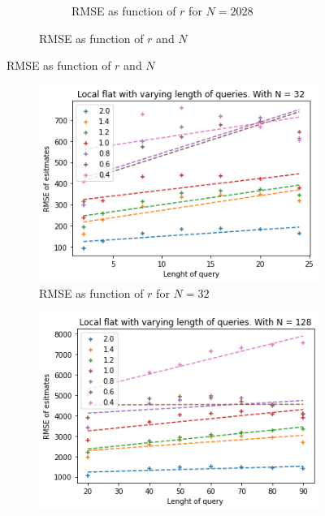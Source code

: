 \documentclass[11pt]{article}
\theoremstyle{definition}
\begin{document}
\begin{figure}[H]
\begin{subfigure}{.4\textwidth}
\begin{subfigure}{\textwidth}
  \caption{RMSE as function of $r$ for $N=2028$}
  \label{fig:19}
\end{subfigure}
\caption{RMSE as function of $r$ and $N$}
\label{fig:20}
\end{subfigure}
\caption{RMSE as function of $r$ and $N$}
\label{fig:21}
\end{figure}
\begin{figure}[H]
\centering
\begin{subfigure}{.4\textwidth}
  \centering
  \includegraphics[width=\linewidth]{figures/local_flat/varying_r/loc_flat_varying_length_N_linear_=32.png}
  \caption{RMSE as function of $r$ for $N=32$}
  \label{fig:22}
\end{subfigure}%
\begin{subfigure}{.4\textwidth}
  \centering
  \includegraphics[width=\linewidth]{figures/local_flat/varying_r/loc_flat_varying_length_N_linear_=128.png}

\end{subfigure}
\end{figure}
\end{document}

